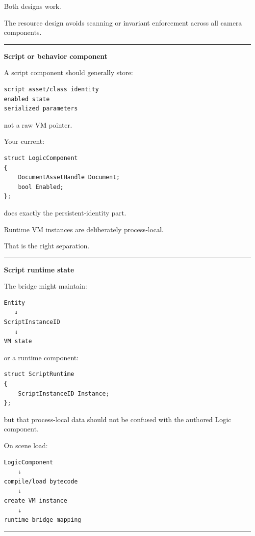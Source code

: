 Both designs work.

The resource design avoids scanning or invariant enforcement across all camera components.

\begin{center}\rule{0.5\linewidth}{0.5pt}\end{center}

\textbf{Script or behavior component}

A script component should generally store:

\begin{verbatim}
script asset/class identity
enabled state
serialized parameters
\end{verbatim}

not a raw VM pointer.

Your current:

\begin{verbatim}
struct LogicComponent
{
    DocumentAssetHandle Document;
    bool Enabled;
};
\end{verbatim}

does exactly the persistent-identity part.

Runtime VM instances are deliberately process-local.

That is the right separation.

\begin{center}\rule{0.5\linewidth}{0.5pt}\end{center}

\textbf{Script runtime state}

The bridge might maintain:

\begin{verbatim}
Entity
   ↓
ScriptInstanceID
   ↓
VM state
\end{verbatim}

or a runtime component:

\begin{verbatim}
struct ScriptRuntime
{
    ScriptInstanceID Instance;
};
\end{verbatim}

but that process-local data should not be confused with the authored Logic component.

On scene load:

\begin{verbatim}
LogicComponent
    ↓
compile/load bytecode
    ↓
create VM instance
    ↓
runtime bridge mapping
\end{verbatim}

\begin{center}\rule{0.5\linewidth}{0.5pt}\end{center}

